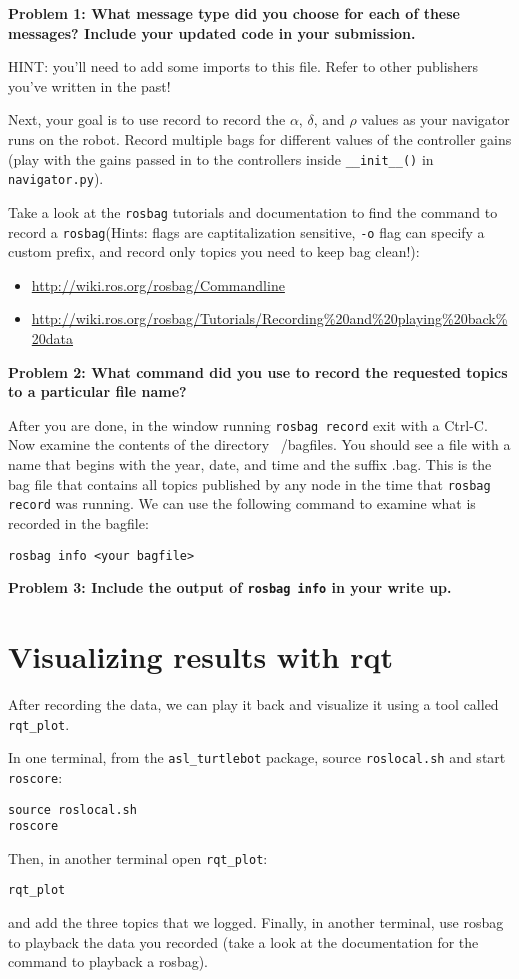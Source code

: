\documentclass{article}
\begin{document}
\textbf{Problem 1: What message type did you choose for each of these messages? Include your updated code in your submission.}

HINT: you'll need to add some imports to this file. Refer to other publishers you've written in the past!

Next, your goal is to use record to record the $\alpha$, $\delta$, and $\rho$ values as your navigator runs on the robot. 
Record multiple bags for different values of the controller gains (play with the gains passed in to the controllers inside \texttt{\_\_init\_\_()} in \texttt{navigator.py}).

Take a look at the 
\texttt{rosbag} tutorials and documentation to find the command to record a \texttt{rosbag}(Hints: flags are captitalization sensitive, \texttt{-o} flag can specify a custom prefix, and record only topics you need to keep bag clean!):
\begin{itemize}
    \item \url{http://wiki.ros.org/rosbag/Commandline}
    \item \url{http://wiki.ros.org/rosbag/Tutorials/Recording\%20and\%20playing\%20back\%20data}
\end{itemize}

\textbf{Problem 2: What command did you use to record the requested topics to a particular file name?}

After you are done, in the window  running \texttt{rosbag record} exit with a Ctrl-C. Now examine the contents of the directory ~/bagfiles. You should see a file with a name that begins with the year, date, and time and the suffix .bag. This is the bag file that contains all topics published by any node in the time that \texttt{rosbag record} was running.
We can use the following command to examine what is recorded in the bagfile:
\begin{lstlisting}
rosbag info <your bagfile>
\end{lstlisting}

\textbf{Problem 3: Include the output of \texttt{rosbag info} in your write up.}
\section{Visualizing results with rqt}
After recording the data, we can play it back and visualize it using a tool called \texttt{rqt\_plot}. 

In one terminal, from the \texttt{asl\_turtlebot} package, source \texttt{roslocal.sh} and start \texttt{roscore}:
\begin{lstlisting}
source roslocal.sh
roscore
\end{lstlisting}
Then, in another terminal open \texttt{rqt\_plot}:
\begin{lstlisting}
rqt_plot
\end{lstlisting}
and add the three topics that we logged. 
Finally, in another terminal, use rosbag to playback the data you recorded (take a look at the documentation for the command to playback a rosbag).
\end{document}
